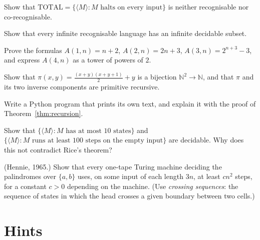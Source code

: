 \begin{exercise}[$\star\star$]\label{ex:total}
Show that $\mathrm{TOTAL}=\{\langle M\rangle:M\text{ halts on every input}\}$ is neither recognisable nor co-recognisable.
\end{exercise}

\begin{exercise}[$\star\star$]\label{ex:infinitesubset}
Show that every infinite recognisable language has an infinite decidable subset.
\end{exercise}

\begin{exercise}[$\star$]\label{ex:ackermann}
Prove the formulas $A(1,n)=n+2$, $A(2,n)=2n+3$, $A(3,n)=2^{n+3}-3$, and express $A(4,n)$ as a tower of powers of $2$.
\end{exercise}

\begin{exercise}[$\star$]\label{ex:pairing}
Show that $\pi(x,y)=\frac{(x+y)(x+y+1)}2+y$ is a bijection $\mathbb N^2\to\mathbb N$, and that $\pi$ and its two inverse components are primitive recursive.
\end{exercise}

\begin{exercise}[$\star\star$]\label{ex:quine}
Write a Python program that prints its own text, and explain it with the proof of Theorem~\ref{thm:recursion}.
\end{exercise}

\begin{exercise}[$\star$]\label{ex:ricesyntax}
Show that $\{\langle M\rangle:M\text{ has at most }10\text{ states}\}$ and $\{\langle M\rangle:M\text{ runs at least }100\text{ steps on the empty input}\}$ are decidable. Why does this not contradict Rice's theorem?
\end{exercise}

\begin{exercise}[$\star\star\star$]\label{ex:hennie}
(Hennie, 1965.) Show that every one-tape Turing machine deciding the palindromes over $\{a,b\}$ uses, on some input of each length $3n$, at least $cn^2$ steps, for a constant $c>0$ depending on the machine. (Use \emph{crossing sequences}: the sequence of states in which the head crosses a given boundary between two cells.)
\end{exercise}

\section{Hints}

